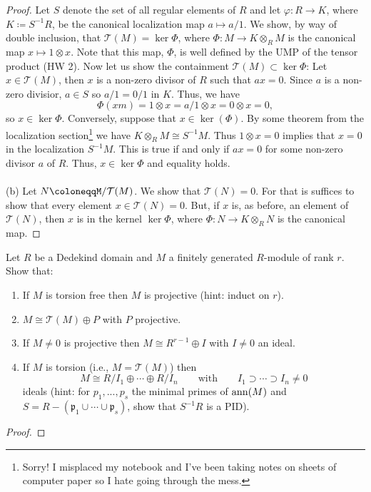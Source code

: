 \begin{proof}
Let $S$ denote the set of all regular elements of $R$ and let
$\varphi\colon R\to K$, where $K\coloneqq S^{-1}R$, be the canonical
localization map $a\mapsto a/1$. We show, by way of double inclusion, that
$\mathcal{T}(M)=\ker\Phi$, where $\Phi\colon M\to K\otimes_R M$ is the
canonical map $x\mapsto 1\otimes x$. Note that this map, $\Phi$, is well
defined by the UMP of the tensor product (HW 2). Now let us show the
containment $\mathcal{T}(M)\subset\ker\Phi$: Let $x\in\mathcal{T}(M)$, then
$x$ is a non-zero divisor of $R$ such that $ax=0$. Since $a$ is a non-zero
divisior, $a\in S$ so $a/1=0/1$ in $K$. Thus, we have
\[
\Phi(xm)=1\otimes x=a/1\otimes x=0\otimes x=0,
\]
so $x\in\ker\Phi$. Conversely, suppose that $x\in\ker(\Phi)$. By some
theorem from the localization section\footnote{Sorry! I misplaced my
notebook and I've been taking notes on sheets of computer paper so I hate
going through the mess.} we have $K\otimes_R M\cong S^{-1}M$. Thus
$1\otimes x=0$ implies that $x=0$ in the localization $S^{-1}M$. This is
true if and only if $ax=0$ for some non-zero divisor $a$ of $R$. Thus,
$x\in\ker\Phi$ and equality holds.
\\\\
(b) Let $N\coloneqqM/\mathcal{T}(M)$. We show that $\mathcal{T}(N)=0$. For
that is suffices to show that every element $x\in\mathcal{T}(N)=0$. But, if
$x$ is, as before, an element of $\mathcal{T}(N)$, then $x$ is in the
kernel $\ker\Phi$, where $\Phi\colon N\to K\otimes_R N$ is the canonical
map.
\end{proof}
\newpage
\begin{problem}
Let $R$ be a Dedekind domain and $M$ a finitely generated $R$-module of
rank $r$. Show that:
\begin{enumerate}[label=(\alph*)]
\item If $M$ is torsion free then $M$ is projective (hint: induct on $r$).
\item $M\cong \mathcal{T}(M)\oplus P$ with $P$ projective.
\item If $M\neq 0$ is projective then $M\cong R^{r-1}\oplus I$ with $I\neq
  0$ an ideal.
\item If $M$ is torsion (i.e., $M=\mathcal{T}(M)$) then
\[
M\cong R/I_1\oplus\cdots\oplus R/I_n\qquad\text{with}\qquad
I_1\supset\cdots\supset I_n\neq 0
\]
ideals (hint: for $p_1,...,p_s$ the minimal primes of $\operatorname{ann}(M)$ and
$S=R\minus(\mathfrak{p}_1\cup\cdots\cup\mathfrak{p}_s)$, show that
$S^{-1}R$ is a PID).
\end{enumerate}
\end{problem}
\begin{proof}
\end{proof}

